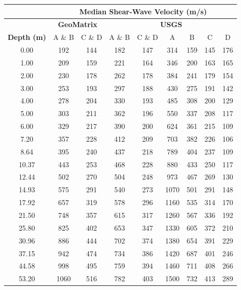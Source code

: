 \documentclass[12pt,oneside]{book}
\begin{document}
\begin{table}[tbp]
    \centering
    \begin{tabular}{ccc|cccccc}
        \hline\hline
        & \multicolumn{8}{c}{\textbf{Median Shear-Wave Velocity (m/s)}} \\
        \hline
        & \multicolumn{2}{c|}{\textbf{GeoMatrix}} 
        & \multicolumn{6}{c}{\textbf{USGS}} \\
        \hline
        \textbf{Depth (m)} & A \& B & C \& D & A \& B & C \& D &
        A & B & C & D  \\
        \hline
        0.00 &  192 & 144 & 182 & 147 &  314 & 159 & 145 & 176 \\
        1.00 &  209 & 159 & 221 & 164 &  346 & 200 & 163 & 165 \\
        2.00 &  230 & 178 & 262 & 178 &  384 & 241 & 179 & 154 \\
        3.00 &  253 & 193 & 297 & 188 &  430 & 275 & 191 & 142 \\
        4.00 &  278 & 204 & 330 & 193 &  485 & 308 & 200 & 129 \\
        5.00 &  303 & 211 & 362 & 196 &  550 & 337 & 208 & 117 \\
        6.00 &  329 & 217 & 390 & 200 &  624 & 361 & 215 & 109 \\
        7.20 &  357 & 228 & 412 & 209 &  703 & 382 & 226 & 106 \\
        8.64 &  395 & 240 & 437 & 218 &  789 & 404 & 237 & 109 \\
        10.37 &  443 & 253 & 468 & 228 &  880 & 433 & 250 & 117 \\
        12.44 &  502 & 270 & 504 & 248 &  973 & 467 & 269 & 130 \\
        14.93 &  575 & 291 & 540 & 273 & 1070 & 501 & 291 & 148 \\
        17.92 &  657 & 319 & 578 & 296 & 1160 & 535 & 314 & 170 \\
        21.50 &  748 & 357 & 615 & 317 & 1260 & 567 & 336 & 192 \\
        25.80 &  825 & 402 & 653 & 347 & 1330 & 605 & 372 & 210 \\
        30.96 &  886 & 444 & 702 & 374 & 1380 & 654 & 391 & 229 \\
        37.15 &  942 & 474 & 734 & 386 & 1420 & 687 & 401 & 246 \\
        44.58 &  998 & 495 & 759 & 394 & 1460 & 711 & 408 & 266 \\
        53.20 & 1060 & 516 & 782 & 403 & 1500 & 732 & 413 & 289 \\

\end{tabular}
\end{table}
\end{document}
